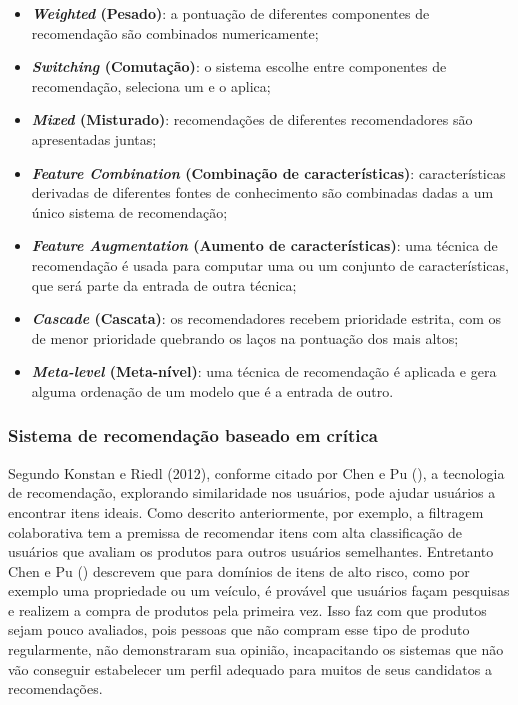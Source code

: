 \begin{itemize}
    \item \textbf{\textit{Weighted} (Pesado)}: a pontuação de diferentes componentes de recomendação são combinados numericamente;
    
    \item \textbf{\textit{Switching} (Comutação)}: o sistema escolhe entre componentes de recomendação, seleciona um e o aplica;
    
    \item \textbf{\textit{Mixed} (Misturado)}: recomendações de diferentes recomendadores são apresentadas juntas;
    
    \item \textbf{\textit{Feature Combination} (Combinação de características)}: características derivadas de diferentes fontes de conhecimento são combinadas dadas a um único sistema de recomendação;
    
    \item \textbf{\textit{Feature Augmentation} (Aumento de características)}:  uma técnica de recomendação é usada para computar uma ou um conjunto de características, que será parte da entrada de outra técnica;
    
    \item \textbf{\textit{Cascade} (Cascata)}: os recomendadores recebem prioridade estrita, com os de menor prioridade quebrando os laços na pontuação dos mais altos;

    \item \textbf{\textit{Meta-level} (Meta-nível)}: uma técnica de recomendação é aplicada e gera alguma ordenação de um modelo que é a entrada de outro.

\end{itemize}

\subsubsection{Sistema de recomendação baseado em crítica}
\label{Critiquing-based}
Segundo Konstan e Riedl (2012), conforme citado por Chen e Pu (\citeyear{Chen:2012}), a tecnologia de recomendação, explorando similaridade nos usuários, pode ajudar usuários a encontrar itens ideais. Como descrito anteriormente, por exemplo, a filtragem colaborativa tem a premissa de recomendar itens com alta classificação de usuários que avaliam os produtos para outros usuários semelhantes. Entretanto Chen e Pu (\citeyear{Chen:2012}) descrevem que para domínios de itens de alto risco, como por exemplo uma propriedade ou um veículo, é provável que usuários façam pesquisas e realizem a compra de produtos pela primeira vez. Isso faz com que produtos sejam pouco avaliados, pois pessoas que não compram esse tipo de produto regularmente, não demonstraram sua opinião, incapacitando os sistemas que não vão conseguir estabelecer um perfil adequado para muitos de seus candidatos a recomendações.

